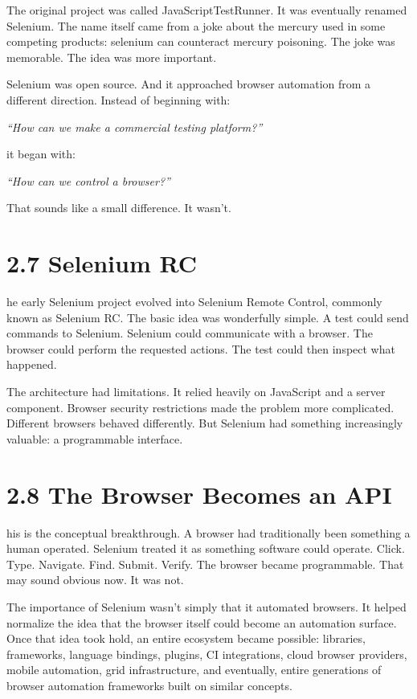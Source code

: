 \documentclass[11pt, a4paper, openany]{book}
\newcommand{\initialcap}[1]{{\fontfamily{lmss}\selectfont\huge\textbf{#1}}}
\begin{document}
The original project was called JavaScriptTestRunner. It was eventually renamed Selenium. The name itself came from a joke about the mercury used in some competing products: selenium can counteract mercury poisoning. The joke was memorable. The idea was more important.

Selenium was open source. And it approached browser automation from a different direction. Instead of beginning with:
\begin{center}
\textit{``How can we make a commercial testing platform?''}
\end{center}
it began with:
\begin{center}
\textit{``How can we control a browser?''}
\end{center}
That sounds like a small difference. It wasn't.

\section{2.7 Selenium RC}
\noindent \initialcap{T}he early Selenium project evolved into Selenium Remote Control, commonly known as Selenium RC. The basic idea was wonderfully simple. A test could send commands to Selenium. Selenium could communicate with a browser. The browser could perform the requested actions. The test could then inspect what happened.

The architecture had limitations. It relied heavily on JavaScript and a server component. Browser security restrictions made the problem more complicated. Different browsers behaved differently. But Selenium had something increasingly valuable: a programmable interface.

\section{2.8 The Browser Becomes an API}
\noindent \initialcap{T}his is the conceptual breakthrough. A browser had traditionally been something a human operated. Selenium treated it as something software could operate. Click. Type. Navigate. Find. Submit. Verify. The browser became programmable. That may sound obvious now. It was not.

The importance of Selenium wasn't simply that it automated browsers. It helped normalize the idea that the browser itself could become an automation surface. Once that idea took hold, an entire ecosystem became possible: libraries, frameworks, language bindings, plugins, CI integrations, cloud browser providers, mobile automation, grid infrastructure, and eventually, entire generations of browser automation frameworks built on similar concepts.
\end{document}
